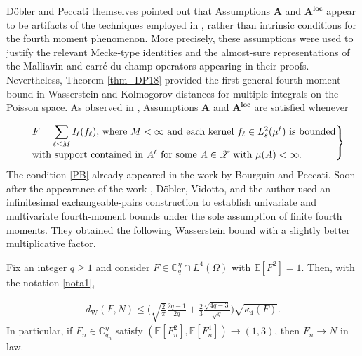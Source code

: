\documentclass[ECP,preprint]{ejpecp}
\newcommand{\E}{\mathbb{E}}
\newcommand{\sZ}{\mathscr{Z}}
\newcommand{\bC}{\mathbb{C}^\eta}
\newcommand{\dW}{d_{\mathrm W}}
\newcommand{\noi}{\noindent}
\begin{document}
D\"obler and Peccati themselves pointed out that Assumptions
$\mathbf A$ and  
$\mathbf A^{\textbf{loc}}$ appear to be artifacts of the techniques
employed in \cite{DP18}, rather than intrinsic conditions for the
fourth moment phenomenon. More precisely, these assumptions were
used to justify the relevant Mecke-type identities and the
almost-sure representations of the Malliavin and
carr\'e-du-champ operators appearing in their proofs. 
Nevertheless, Theorem \ref{thm_DP18} provided the first general fourth moment bound in
Wasserstein and Kolmogorov distances for multiple   integrals on the Poisson space.
As observed in \cite[Rem. 1.2]{DP18}, Assumptions
$\mathbf A$ and $\mathbf A^{\textbf{loc}}$ are satisfied whenever

\noi
  \begin{align} \label{PB}
  \begin{rcases}
  &\text{${\displaystyle F= \sum_{\ell\leq M} I_\ell(f_\ell)}$, where 
  $M <\infty$ and each kernel  $f_\ell\in L^2_s(\mu^\ell)$ is  bounded}\\[-0.3em]
 &\text{with support   contained in $A^\ell$
  for some $A\in\sZ$ with $\mu(A) <\infty$.}
  \end{rcases}
 \end{align}
The condition \eqref{PB} already appeared in the work \cite{BP16}
by Bourguin and Peccati.
Soon after the appearance of the work \cite{DP18}, 
D\"obler, Vidotto, and the author \cite{DVZ18} 
  used an infinitesimal exchangeable-pairs construction
 to establish univariate and multivariate
fourth-moment bounds under the sole assumption of finite fourth
moments. 
They obtained the following Wasserstein bound  
 with a slightly better multiplicative factor.
 

\begin{theorem} \label{thm_DVZ18}
Fix an integer $q\geq 1$ and consider  $F\in\bC_q\cap L^4(\Omega)$ with $\E[ F^2] =1$.
Then,  with the notation \eqref{nota1},

\noi
\begin{align}\label{bdd_DVZ}
\dW(F, N) 
\leq 
\Big( \sqrt{\frac{2}{\pi}} \frac{2q-1}{2q} 
+ \frac{2}{3} \frac{\sqrt{4q-3}}{\sqrt{q}} 
\Big)
\sqrt{\kappa_4(F)}.
\end{align}
In particular, if $F_n\in\bC_{q_n}$ satisfy $(\E[ F^2_n], \E[ F^4_n])  \to (1, 3)$,
then $F_n\to N$ in law.
\end{theorem}
\end{document}
